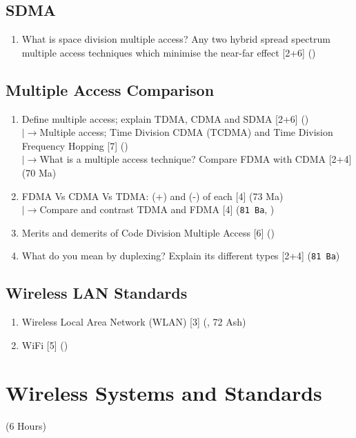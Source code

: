 \documentclass[12pt]{article}
\newcommand{\lb}{\\$\left|\rightarrow\right.$}
\begin{document}
  \subsection{SDMA}
    \begin{enumerate}[topsep=0pt, noitemsep]
      \item What is space division multiple access? Any two hybrid spread spectrum multiple
        access techniques which minimise the near-far effect \hfill [2+6] ()
    \end{enumerate}

  \subsection{Multiple Access Comparison}
    \begin{enumerate}[topsep=0pt, noitemsep]
      \item Define multiple access; explain TDMA, CDMA and SDMA \hfill [2+6] ()
        \lb Multiple access; Time Division CDMA (TCDMA) and Time Division Frequency Hopping \hfill [7] ()
        \lb What is a multiple access technique? Compare FDMA with CDMA \hfill [2+4] (70 Ma)
      \item FDMA Vs CDMA Vs TDMA: (+) and (-) of each \hfill [4] (73 Ma)
        \lb Compare and contrast TDMA and FDMA \hfill [4] (\texttt{81 Ba}, )
      \item Merits and demerits of Code Division Multiple Access \hfill [6] ()
      \item What do you mean by duplexing? Explain its different types \hfill [2+4] (\texttt{81 Ba})
    \end{enumerate}

  \subsection{Wireless LAN Standards}
    \begin{enumerate}[topsep=0pt, noitemsep]
      \item Wireless Local Area Network (WLAN) \hfill [3] (, 72 Ash)
      \item WiFi \hfill [5] ()
    \end{enumerate}

\pagebreak
\section{Wireless Systems and Standards}
\begin{center}(6 Hours)\end{center}
\end{document}
